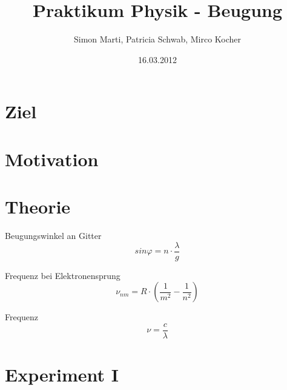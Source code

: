 \documentclass[12pt,a4paper]{article}
\title{Praktikum Physik - Beugung}
\author{Simon Marti, Patricia Schwab, Mirco Kocher}
\date{16.03.2012}
\begin{document}
\maketitle

\section*{Ziel}

\section*{Motivation}

\section*{Theorie}
Beugungswinkel an Gitter
\begin{equation}\label{eq:g}
sin\varphi = n\cdot \frac{\lambda}{g}
\end{equation}

Frequenz bei Elektronensprung
\begin{equation}
\nu_{nm} = R\cdot \left(\frac{1}{m^2}-\frac{1}{n^2}\right)
\end{equation}

Frequenz
\begin{equation}
\nu = \frac{c}{\lambda}
\end{equation}

\section*{Experiment I}

\end{document}
